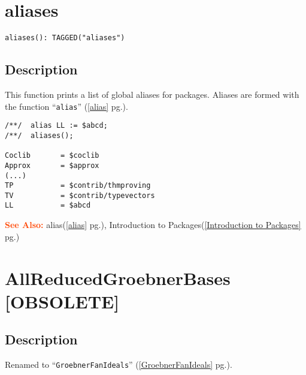 \documentclass[a4paper]{mybook}
\newenvironment{command}{}{} %
\newcommand\SeeAlso{\par\textcolor{OrangeRed}{\textbf{\large See Also: }}}
\begin{document}
\section{aliases}
\label{aliases}
\begin{command} %


\begin{Verbatim}[label=syntax, rulecolor=\color{MidnightBlue},
frame=single]
aliases(): TAGGED("aliases")
\end{Verbatim}


\subsection*{Description}

This function prints a list of global aliases for packages. Aliases
are formed with the function ``\verb&alias&'' (\ref{alias} pg.\pageref{alias}).
\begin{Verbatim}[label=example, rulecolor=\color{PineGreen}, frame=single]
/**/  alias LL := $abcd;
/**/  aliases();

Coclib       = $coclib
Approx       = $approx
(...)
TP           = $contrib/thmproving
TV           = $contrib/typevectors
LL           = $abcd
\end{Verbatim}


\SeeAlso %
  alias(\ref{alias} pg.\pageref{alias}), 
    Introduction to Packages(\ref{Introduction to Packages} pg.\pageref{Introduction to Packages})
\end{command} %

\section{AllReducedGroebnerBases [OBSOLETE]}
\label{AllReducedGroebnerBases [OBSOLETE]}
\begin{command} %



\subsection*{Description}

Renamed to ``\verb&GroebnerFanIdeals&'' (\ref{GroebnerFanIdeals} pg.\pageref{GroebnerFanIdeals}).

\end{command} %
\end{document}
